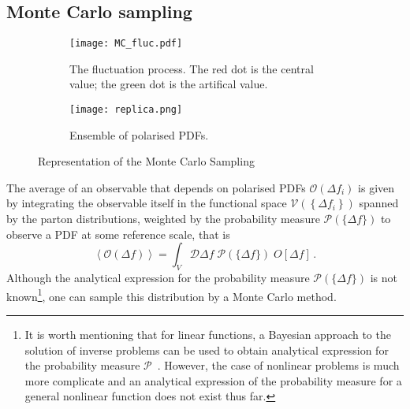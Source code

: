 \subsection{Monte Carlo sampling}
\label{sec:MCS}
\begin{figure}[t]
  \centering
  \begin{subfigure}[b]{0.45\textwidth}
      \centering
      \texttt{[image: MC\_fluc.pdf]}
      \caption{The fluctuation process. The red dot is the central value; the green dot is the artifical value.}
      \label{fig:MC_fluc}
  \end{subfigure}
  \hfill
  \begin{subfigure}[b]{0.45\textwidth}
      \centering
      \texttt{[image: replica.png]}
      \caption{Ensemble of polarised PDFs.}
      \label{fig:PDF_ensemble}
  \end{subfigure}
     \caption{Representation of the Monte Carlo Sampling}
     \label{fig:MC_2_Gr}
\end{figure}
The average of an observable that depends on polarised PDFs $\mathcal{O}(\Delta f_i)$ is given by integrating the observable itself in the functional space $\mathcal{V}\left( \left\{ \Delta f_i \right\}\right)$ spanned by the parton distributions, weighted by the probability measure $\mathcal{P}\left(\{\Delta f\}\right)$ to observe a PDF at some reference scale, that is \cite*{Nocera:2014vla}
\begin{equation}
  \left< \mathcal{O}(\Delta f) \right> = \int_{V} \mathcal{D} \Delta f \; \mathcal{P}\left( \{\Delta f \}\right) \; O \left[ \Delta f \right] \,.
\end{equation}
Although the analytical expression for the probability measure $\mathcal{P}\left( \{\Delta f \}\right)$ is not known\footnote{\footnotesize It is worth mentioning that for linear functions, a Bayesian approach to the solution of inverse problems can be used to obtain analytical expression for the probability measure $\mathcal{P}$~\cite{DelDebbio:2021whr}. However, the case of nonlinear problems is much more complicate and an analytical expression of the probability measure for a general nonlinear function does not exist thus far.}, one can sample this distribution by a Monte Carlo method.%

